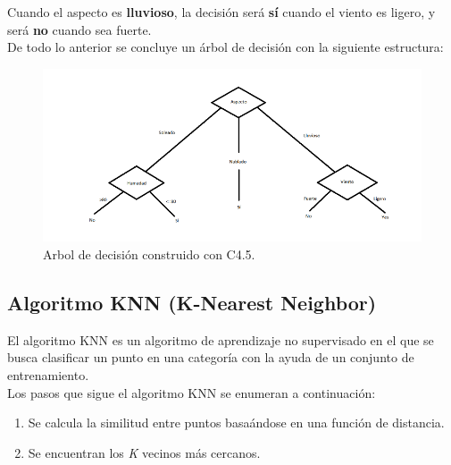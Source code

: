 \begin{UClist}
	Cuando el aspecto es \textbf{lluvioso}, la decisión será \textbf{sí} cuando el viento es ligero, y será \textbf{no} cuando sea fuerte.\\

	\UCli De todo lo anterior se concluye un árbol de decisión con la siguiente estructura:\\

	\begin{figure}[H]
		\hypertarget{fig:arbol-final-c45}{\hspace{1pt}}
		\begin{center}
			\includegraphics{capitulo2/images/arbol-final-c45.png}
			\caption{Arbol de decisión construido con C4.5.}
			\label{fig:arbol-final-c45}
		\end{center}
	\end{figure}

\end{UClist}

\newpage
\subsection{Algoritmo KNN (K-Nearest Neighbor)}
El algoritmo KNN es un algoritmo de aprendizaje no supervisado en el que se busca clasificar un punto en una categoría con la ayuda de un conjunto de entrenamiento.\\

Los pasos que sigue el algoritmo KNN se enumeran a continuación:\\

\begin{enumerate}
	\item Se calcula la similitud entre puntos basaándose en una función de distancia.\\
	\item Se encuentran los \emph{K} vecinos más cercanos.\\
\end{enumerate}

